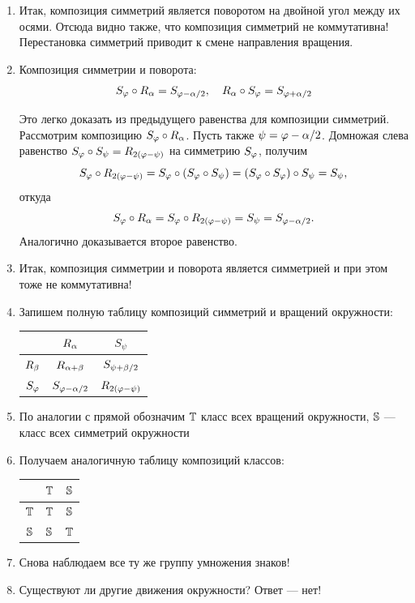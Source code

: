 \begin{enumerate}
\item Итак, композиция симметрий является поворотом на двойной угол между их осями. Отсюда видно также, что композиция симметрий не коммутативна! Перестановка симметрий приводит к смене направления вращения.
\item Композиция симметрии и поворота:
$$
S_\ph\circ R_\al = S_{\ph-\al/2},\quad R_\al\circ S_\ph = S_{\ph+\al/2}
$$

Это легко доказать из предыдущего равенства для композиции симметрий. Рассмотрим композицию $S_\ph\circ R_\al$. Пусть также $\psi = \ph-\al/2$. Домножая слева равенство $S_\ph\circ S_\psi=R_{2(\ph-\psi)}$ на симметрию $S_\ph$, получим
$$
S_\ph\circ R_{2(\ph-\psi)}=S_\ph\circ (S_\ph\circ S_\psi)=(S_\ph\circ S_\ph)\circ S_\psi=S_\psi,
$$
откуда
$$
S_\ph\circ R_\al = S_\ph\circ R_{2(\ph-\psi)} = S_\psi = S_{\ph-\al/2}.
$$
Аналогично доказывается второе равенство.
\item Итак, композиция симметрии и поворота является симметрией и при этом тоже не коммутативна!
\item Запишем полную таблицу композиций симметрий и вращений окружности:
\begin{center}
\begin{tabular}{c|c|c|}
  & $R_\al$ & $S_\psi$ \\
 \hline
$R_\be$ & $R_{\al+\be}$ & $S_{\psi+\be/2}$ \\
 \hline
$S_\ph$ & $S_{\ph-\al/2}$ & $R_{2(\ph-\psi)}$ \\
\hline
\end{tabular}
\end{center}
\item По аналогии с прямой обозначим $\T$ класс всех вращений окружности, $\S$ --- класс всех симметрий окружности
\item Получаем аналогичную таблицу композиций классов:
\begin{center}
\begin{tabular}{c|c|c|}
  & $\T$ & $\S$ \\
 \hline
$\T$ & $\T$ & $\S$ \\
 \hline
$\S$ & $\S$ & $\T$ \\
\hline
\end{tabular}
\end{center}

\item Снова наблюдаем все ту же группу умножения знаков!
\item Существуют ли другие движения окружности? Ответ --- нет!


\end{enumerate}
